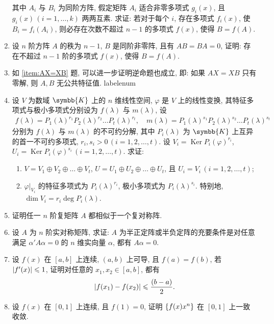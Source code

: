 \documentclass{ctexart}
\makeatletter
\let\set\qty
\let\le\leqslant
\def\asteriskitem{*}
\def\sitem{%
  \expandafter\let\expandafter\originallabel\csname labelenum\romannumeral\@enumdepth\endcsname
  \expandafter\def\csname labelenum\romannumeral\@enumdepth\expandafter\endcsname\expandafter{%
    \expandafter\bfseries\expandafter\color{red}\expandafter{\expandafter\asteriskitem\expandafter\originallabel}}%
  \item
  \expandafter\let\csname labelenum\romannumeral\@enumdepth\endcsname\originallabel
}
\newcommand{\K}{\ensuremath{\symbb{K}}}
\DeclareMathOperator{\Ker}{Ker}
\makeatother
\begin{document}
\begin{enumerate}[series=exer]
    其中 $ A_{i} $ 与 $ B_{i} $ 为同阶方阵, 假定矩阵 $ A_{i} $ 适合非零多项式 $ g_{i}(x) $, 且 $ g_{i}(x)\,(i = 1, \dots, k) $ 两两互素. 求证: 若对于每个 $ i $, 存在多项式 $ f_{i}(x) $, 使 $ B_{i} = f_{i}(A_{i}) $, 则必存在次数不超过 $ n-1 $ 的多项式 $ f(x) $, 使得 $ B = f(A) $.
    \item 设 $ n $ 阶方阵 $ A $ 的秩为 $ n-1 $, $ B $ 是同阶非零阵, 且有 $ AB = BA = 0 $, 证明: 存在不超过 $ n-1 $ 阶的多项式 $ f(x) $, 使得 $ B = f(A) $.
    \item 如 \ref{item:AX=XB} 题, 可以进一步证明逆命题也成立, 即: 如果 $ AX = XB $ 只有零解, 则 $ A, B $ 无公共特征值.
    \sitem 设 $ V $ 为数域 $ \K $ 上的 $ n $ 维线性空间, $ \varphi $ 是 $ V $ 上的线性变换, 其特征多项式与极小多项式分别设为 $ f(\lambda) $ 与 $ m(\lambda) $, 设
    \begin{align*}
        f(\lambda) = P_{1}(\lambda)^{r_{1}}P_{2}(\lambda)^{r_{2}}\dots P_{t}(\lambda)^{r_{t}}, \quad m(\lambda) = P_{1}(\lambda)^{s_{1}}P_{2}(\lambda)^{s_{2}}\dots P_{t}(\lambda)^{s_{t}}
    \end{align*}
    分别为 $ f(\lambda) $ 与 $ m(\lambda) $ 的不可约分解, 其中 $ P_{i}(\lambda) $ 为 $ \K $ 上互异的首一不可约多项式, $ r_{i}, s_{i} > 0\, (i = 1, 2, \dots, t) $. 设 $ V_{i} = \Ker P_{i}(\varphi)^{r_{i}} $, $ U_{i} = \Ker P_{i}(\varphi)^{s_{i}}\,(i = 1, 2, \dots, t) $. 求证:
    \begin{enumerate}
        \item $ V = V_{1} \oplus V_{2} \oplus \dots \oplus V_{t} $, $ U = U_{1} \oplus U_{2} \oplus \dots \oplus U_{t} $, 且 $ U_{i} = V_{i}\,(i = 1, 2, \dots, t) $;
        \item $ \varphi|_{V_{i}} $ 的特征多项式为 $ P_{i}(\lambda)^{r_{i}} $, 极小多项式为 $ P_{i}(\lambda)^{s_{i}} $. 特别地, $ \dim V_{i} = r_{i}\deg P_{i}(\lambda) $. 
    \end{enumerate}
    \item 证明任一 $ n $ 阶复矩阵 $ A $ 都相似于一个复对称阵.
    \item 设 $ A $ 为 $ n $ 阶实对称矩阵, 求证: $ A $ 为半正定阵或半负定阵的充要条件是对任意满足 $ \alpha' A\alpha = 0 $ 的 $ n $ 维实向量 $ \alpha $, 都有 $ A\alpha = 0 $.
    \item 设 $ f(x) $ 在 $ [a, b] $ 上连续, $ (a, b) $ 上可导, 且 $ f(a) = f(b) $, 若 $ \abs{f'(x)} \le 1 $, 证明对任意的 $ x_{1}, x_{2} \in [a, b] $, 都有
    \begin{align*}
        \abs{f(x_{1}) - f(x_{2})} \le \frac{(b - a)}{2}.
    \end{align*}
    \item 设 $ f(x) $ 在 $ [0, 1] $ 上连续, 且 $ f(1) = 0 $, 证明 $ \set{f(x)x^{n}} $ 在 $ [0, 1] $ 上一致收敛.

\end{enumerate}
\end{document}
